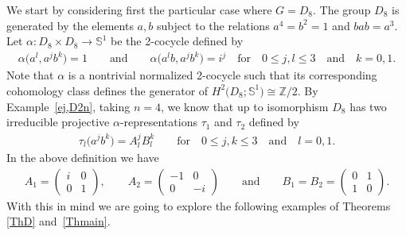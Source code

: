 \documentclass[10pt,a4paper]{amsart}
\def\Z{\mathbb{Z}}
\def\S{\mathbb{S}}
\theoremstyle{definition}
\numberwithin{equation}{section}
\begin{document}

We start by considering first the particular case where $G=D_{8}$. The group $D_{8}$
is generated by the elements $a,b$ subject to the relations $a^{4}=b^{2}=1$ and $bab=a^{3}$.
Let $\alpha\colon D_{8}\times D_{8}\rightarrow \S^{1}$ be the 2-cocycle defined by
\begin{gather*}
\alpha\big(a^{l},a^{j}b^{k}\big)=1\qquad \text{and}\qquad
\alpha\big(a^{l}b,a^{j}b^{k}\big)=i^{j}
\quad \text{for} \quad 0\leq j,l\leq 3 \quad \text{and}\quad k=0,1.
\end{gather*}
Note that $\alpha$ is a nontrivial normalized 2-cocycle such that its corresponding
cohomology class defines the generator of $H^{2}\big(D_{8};\S^{1}\big)\cong \Z/2$.
By Example~\ref{ej,D2n}, taking $n=4$, we know that up to isomorphism $D_{8}$ has two
irreducible projective $\alpha$-representations
$\tau_{1}$ and $\tau_{2}$ defined by
\begin{gather*}
\tau_{l}\big(a^{j}b^{k}\big)=A_{l}^{j}B_{l}^{k} \qquad \text{for} \quad 0\leq j,k\leq 3
\quad \text{and} \quad l=0,1.
\end{gather*}
In the above definition we have
\begin{gather*}
A_{1}=
\begin{pmatrix}
i & 0\\
0 & 1
\end{pmatrix},\qquad
A_{2}=
\begin{pmatrix}
-1 & 0\\
0 & -i
\end{pmatrix}
\qquad \text{and}\qquad
B_{1}=B_{2}=
\begin{pmatrix}
0 & 1\\
1 & 0
\end{pmatrix}\!.
\end{gather*}
With this in mind we are going to explore the following examples of Theorems
\ref{ThD} and~\ref{Thmain}.
\end{document}
